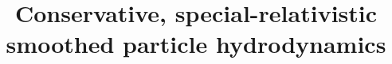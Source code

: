 \documentclass{elsart}
\begin{document}
\def\msun{${\rm M_{\odot}} \;$}
\def\be{\begin{equation}}
\def\ee{\end{equation}}
\def\gcc{g cm$^{-3}$}
\def\cc{cm$^{-3}$}
\def\bi{\begin{itemize}}
\def\ei{\end{itemize}}
\newcommand{\ii}{\item}
\def\ben{\begin{enumerate}}
\def\een{\end{enumerate}}

\def\i{\item}
\def\bea{\begin{eqnarray}}
\def\eea{\end{eqnarray}}
\def\p{\partial}
\def\dt{\Delta t}
\def\divv{\nabla \cdot \vec{v}}

\begin{frontmatter}




















\title{Conservative, special-relativistic smoothed particle hydrodynamics}









\end{frontmatter}
\end{document}

